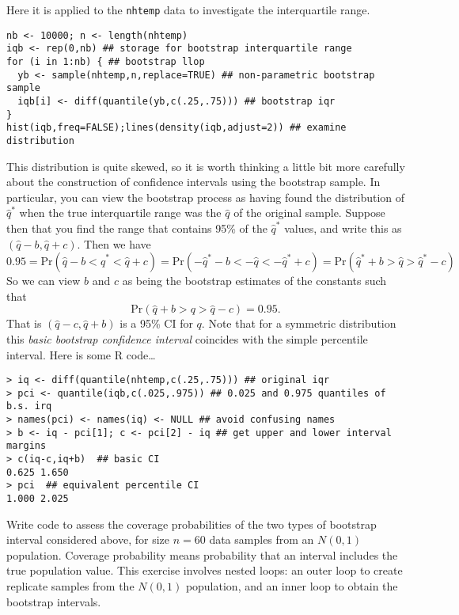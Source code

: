 \documentclass[10pt] {article}
\newcommand{\eps}[3]
{{\begin{center}
 \rotatebox{#1}{\scalebox{#2}{\texttt{[image: \#3]}}}
 \end{center}}
}
\theoremstyle{definition}
\begin{document}
Here it is applied to the {\tt nhtemp} data to investigate the interquartile range.  
\begin{lstlisting}
nb <- 10000; n <- length(nhtemp)
iqb <- rep(0,nb) ## storage for bootstrap interquartile range
for (i in 1:nb) { ## bootstrap llop
  yb <- sample(nhtemp,n,replace=TRUE) ## non-parametric bootstrap sample
  iqb[i] <- diff(quantile(yb,c(.25,.75))) ## bootstrap iqr
}
hist(iqb,freq=FALSE);lines(density(iqb,adjust=2)) ## examine distribution
\end{lstlisting}
\eps{-90}{.5}{nht-np-bs.eps}
This distribution is quite skewed, so it is worth thinking a little bit more carefully about the construction of confidence intervals using the bootstrap sample. In particular, you can view the bootstrap process as having found the distribution of $\hat q^*$ when the true interquartile range was the $\hat q$ of the original sample. Suppose then that you find the range that contains 95\% of the $\hat q^*$ values, and write this as $(\hat q - b,\hat q + c)$. Then we have
$$
0.95 = \text{Pr}(\hat q - b < \hat q^* <\hat q + c) = \text{Pr}(-\hat q^* - b < -\hat q < -\hat q^* + c) = 
\text{Pr}(\hat q^* + b > \hat q > \hat q^* - c)
$$
So we can view $b$ and $c$ as being the bootstrap estimates of the constants such that 
$$\text{Pr}(\hat q + b > q > \hat q - c) = 0.95.
$$
That is $(\hat q - c,\hat q +b)$ is a 95\% CI for $q$.
 Note that for a symmetric distribution this {\em basic bootstrap confidence interval} coincides with the simple percentile interval. Here is some R code\ldots  {}
 
\begin{lstlisting}
> iq <- diff(quantile(nhtemp,c(.25,.75))) ## original iqr
> pci <- quantile(iqb,c(.025,.975)) ## 0.025 and 0.975 quantiles of b.s. irq
> names(pci) <- names(iq) <- NULL ## avoid confusing names
> b <- iq - pci[1]; c <- pci[2] - iq ## get upper and lower interval margins
> c(iq-c,iq+b)  ## basic CI
0.625 1.650 
> pci  ## equivalent percentile CI
1.000 2.025 
\end{lstlisting}

\bigskip

 Write code to assess the coverage probabilities of the two types of bootstrap interval considered above, for size $n=60$ data samples from an $N(0,1)$ population. Coverage probability means probability that an interval includes the true population value. This exercise involves nested loops: an outer loop to create replicate samples from the $N(0,1)$ population, and an inner loop to obtain the bootstrap intervals.  
\end{document}
